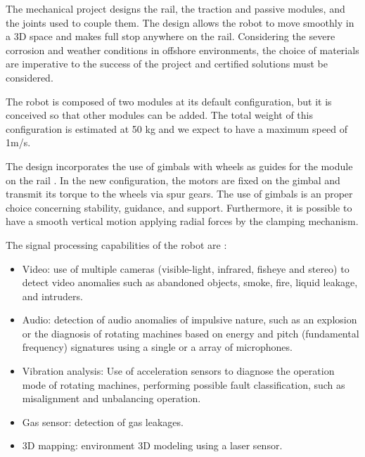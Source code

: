 \documentclass{ifacconf}
\begin{document}
The mechanical project designs the rail, the
traction and passive modules, and the joints used to couple them. The design
allows the robot to move smoothly in a 3D space and makes full stop anywhere
on the rail. Considering the severe corrosion and weather conditions in
offshore environments, the choice of materials are imperative to the success of
the project and certified solutions must be considered.

The robot is composed of two modules at its default configuration, but it is
conceived so that other modules can be added. The total weight of this
configuration is estimated at 50 kg and we expect to have a maximum speed of
1m/s.

The design incorporates the use of gimbals with wheels as guides for
the module on the rail \cite{cba}. In the new configuration, the motors are
fixed on the gimbal and transmit its torque to the wheels via spur gears. The use of gimbals
is an proper choice concerning stability, guidance, and support. Furthermore,
it is possible to have a smooth vertical motion applying radial forces by the
clamping mechanism.

The signal processing capabilities of the robot are \cite{cba}:

\begin{itemize}
  \item Video: use of multiple cameras (visible-light, infrared, fisheye and
  stereo) to detect video anomalies such as abandoned objects, smoke, fire,
  liquid leakage, and intruders.
  \item Audio: detection of audio anomalies of impulsive nature, such as an
  explosion or the diagnosis of rotating machines based on energy and pitch
  (fundamental frequency) signatures using a single or a array of microphones.
  \item Vibration analysis: Use of acceleration sensors to diagnose the
  operation mode of rotating machines, performing possible fault
  classification, such as misalignment and unbalancing operation.
  \item Gas sensor: detection of gas leakages.
  \item 3D mapping: environment 3D modeling using a laser sensor.
\end{itemize}
\end{document}

